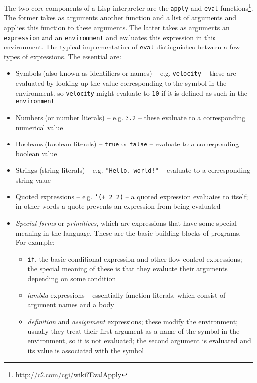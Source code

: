 The two core components of a Lisp interpreter are the \texttt{apply} and
\texttt{eval}
functions\cite{sicp_meta}\footnote{\url{http://c2.com/cgi/wiki?EvalApply}}. The
former takes as arguments another function and a list of arguments and applies
this function to these arguments. The latter takes as arguments an
\texttt{expression} and an \texttt{environment} and evaluates this expression in
this environment. The typical implementation of \texttt{eval} distinguishes
between a few types of expressions. The essential are:
\begin{itemize}
	\item Symbols (also known as identifiers or names) --
          e.g. \texttt{velocity} -- these are evaluated by looking up the value
          corresponding to the symbol in the environment, so \texttt{velocity}
          might evaluate to \texttt{10} if it is defined as such in the
          \texttt{environment}
	\item Numbers (or number literals) -- e.g. \texttt{3.2} -- these
          evaluate to a corresponding numerical value
	\item Booleans (boolean literals) -- \texttt{true} or \texttt{false} --
          evaluate to a corresponding boolean value
	\item Strings (string literals) -- e.g. \texttt{"Hello, world!"} --
          evaluate to a corresponding string value
	\item Quoted expressions -- e.g. \texttt{'(+ 2 2)} -- a quoted
          expression evaluates to itself; in other words a quote prevents an
          expression from being evaluated
	\item \textit{Special forms} or \textit{primitives}, which are
          expressions that have some special meaning in the language. These are
          the basic building blocks of programs. For example:
	\begin{itemize}
		\item \texttt{if}, the basic conditional expression and other
                  flow control expressions; the special meaning of these is that
                  they evaluate their arguments depending on some condition
		\item \textit{lambda} expressions -- essentially function
                  literals, which consist of argument names and a body
		\item \textit{definition} and \textit{assignment} expressions;
                  these modify the environment; usually they treat their first
                  argument as a name of the symbol in the environment, so it is
                  not evaluated; the second argument is evaluated and its value
                  is associated with the symbol
	\end{itemize}
\end{itemize}

